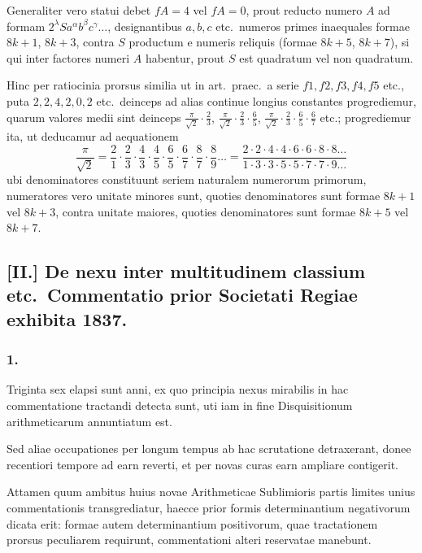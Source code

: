 \documentclass[12pt,a4paper]{article}
\begin{document}
Generaliter vero statui debet $fA=4$ vel $fA=0$, prout reducto numero $A$ ad formam $2^\lambda S a^\alpha b^\beta c^\gamma\ldots$, designantibus $a, b, c$ etc.\ numeros primes inaequales formae $8k+1$, $8k+3$, contra $S$ productum e numeris reliquis (formae $8k+5$, $8k+7$), si qui inter factores numeri $A$ habentur, prout $S$ est quadratum vel non quadratum.

Hinc per ratiocinia prorsus similia ut in art.\ praec.\ a serie $f1, f2, f3, f4, f5$ etc., puta $2, 2, 4, 2, 0, 2$ etc.\ deinceps ad alias continue longius constantes progrediemur, quarum valores medii sint deinceps $\frac{\pi}{\sqrt{2}}\cdot\frac{2}{3}$, $\frac{\pi}{\sqrt{2}}\cdot\frac{2}{3}\cdot\frac{6}{5}$, $\frac{\pi}{\sqrt{2}}\cdot\frac{2}{3}\cdot\frac{6}{5}\cdot\frac{6}{7}$ etc.; progrediemur ita, ut deducamur ad aequationem
\[
\frac{\pi}{\sqrt{2}} = \frac{2}{1}\cdot\frac{2}{3}\cdot\frac{4}{3}\cdot\frac{4}{5}\cdot\frac{6}{5}\cdot\frac{6}{7}\cdot\frac{8}{7}\cdot\frac{8}{9}\ldots = \frac{2\cdot 2\cdot 4\cdot 4\cdot 6\cdot 6\cdot 8\cdot 8\ldots}{1\cdot 3\cdot 3\cdot 5\cdot 5\cdot 7\cdot 7\cdot 9\ldots}
\]
ubi denominatores constituunt seriem naturalem numerorum primorum, numeratores vero unitate minores sunt, quoties denominatores sunt formae $8k+1$ vel $8k+3$, contra unitate maiores, quoties denominatores sunt formae $8k+5$ vel $8k+7$.

\subsection*{[II.] De nexu inter multitudinem classium etc.\ Commentatio prior Societati Regiae exhibita 1837.}

\subsubsection*{1.}

Triginta sex elapsi sunt anni, ex quo principia nexus mirabilis in hac commentatione tractandi detecta sunt, uti iam in fine Disquisitionum arithmeticarum annuntiatum est.

Sed aliae occupationes per longum tempus ab hac scrutatione detraxerant, donee recentiori tempore ad earn reverti, et per novas curas earn ampliare contigerit.

Attamen quum ambitus huius novae Arithmeticae Sublimioris partis limites unius commentationis transgrediatur, haecce prior formis determinantium negativorum dicata erit: formae autem determinantium positivorum, quae tractationem prorsus peculiarem requirunt, commentationi alteri reservatae manebunt.
\end{document}
